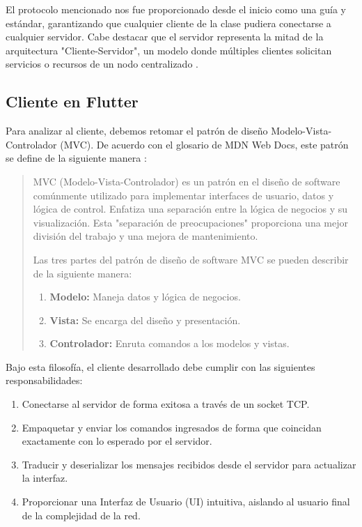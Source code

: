 El protocolo mencionado nos fue proporcionado desde el inicio como una guía y estándar, garantizando que cualquier cliente de la clase pudiera conectarse a cualquier servidor. Cabe destacar que el servidor representa la mitad de la arquitectura "Cliente-Servidor", un modelo donde múltiples clientes solicitan servicios o recursos de un nodo centralizado \cite{client-server-arch}.

\subsection{Cliente en Flutter}
Para analizar al cliente, debemos retomar el patrón de diseño Modelo-Vista-Controlador (MVC). De acuerdo con el glosario de MDN Web Docs, este patrón se define de la siguiente manera \cite{mdn-mvc}:

\begin{quote}
    MVC (Modelo-Vista-Controlador) es un patrón en el diseño de software comúnmente utilizado para implementar interfaces de usuario, datos y lógica de control. Enfatiza una separación entre la lógica de negocios y su visualización. Esta "separación de preocupaciones" proporciona una mejor división del trabajo y una mejora de mantenimiento.
    
    Las tres partes del patrón de diseño de software MVC se pueden describir de la siguiente manera:
    \begin{enumerate}
        \item \textbf{Modelo:} Maneja datos y lógica de negocios.
        \item \textbf{Vista:} Se encarga del diseño y presentación.
        \item \textbf{Controlador:} Enruta comandos a los modelos y vistas.
    \end{enumerate}
\end{quote}

Bajo esta filosofía, el cliente desarrollado debe cumplir con las siguientes responsabilidades:

\begin{enumerate}
    \item Conectarse al servidor de forma exitosa a través de un socket TCP.
    \item Empaquetar y enviar los comandos ingresados de forma que coincidan exactamente con lo esperado por el servidor.
    \item Traducir y deserializar los mensajes recibidos desde el servidor para actualizar la interfaz.
    \item Proporcionar una Interfaz de Usuario (UI) intuitiva, aislando al usuario final de la complejidad de la red.
\end{enumerate}

